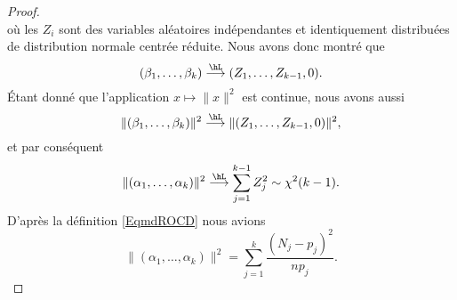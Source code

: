 \begin{proof}
\begin{subequations}
	\end{subequations}
	où les \( Z_i\) sont des variables aléatoires indépendantes et identiquement distribuées de distribution normale centrée réduite. Nous avons donc montré que
	\begin{equation}
		(\beta_1,\ldots, \beta_k)\stackrel{\hL}{\longrightarrow}(Z_1,\ldots, Z_{k-1},0).
	\end{equation}
	Étant donné que l'application \( x\mapsto \| x \|^2\) est continue, nous avons aussi
	\begin{equation}
		\| (\beta_1,\ldots, \beta_k) \|^2\stackrel{\hL}{\longrightarrow}\| (Z_1,\ldots, Z_{k-1},0) \|^2,
	\end{equation}
	et par conséquent
	\begin{equation}
		\| (\alpha_1,\ldots, \alpha_k) \|^2\stackrel{\hL}{\longrightarrow}\sum_{j=1}^{k-1}Z_j^2\sim\chi^2(k-1).
	\end{equation}
	D'après la définition \eqref{EqmdROCD} nous avions
	\begin{equation}
		\| (\alpha_1,\ldots, \alpha_k) \|^2=\sum_{j=1}^k\frac{ (N_j-p_j)^2 }{ np_j }.
	\end{equation}
\end{proof}
